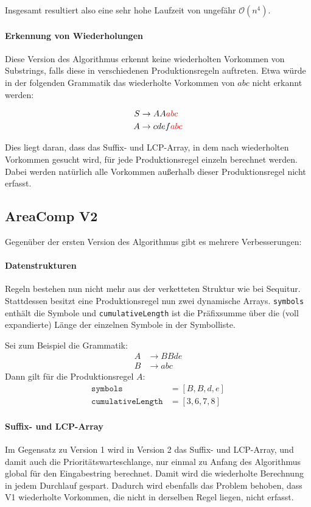 Insgesamt resultiert also eine sehr hohe Laufzeit von ungefähr $\mathcal{O}(n^4)$.

\paragraph{Erkennung von Wiederholungen}
Diese Version des Algorithmus erkennt keine wiederholten Vorkommen von Substrings, falls diese in verschiedenen Produktionsregeln auftreten.
Etwa würde in der folgenden Grammatik das wiederholte Vorkommen von $abc$ nicht erkannt werden:

\begin{align*}
	S &\rightarrow AA\textcolor{red}{abc}\\
	A &\rightarrow cdef\textcolor{red}{abc}
\end{align*}

Dies liegt daran, dass das Suffix- und LCP-Array, in dem nach wiederholten Vorkommen gesucht wird, für jede Produktionsregel einzeln berechnet werden. Dabei werden natürlich alle Vorkommen außerhalb dieser Produktionsregel nicht erfasst.

\subsection{AreaComp V2}

Gegenüber der ersten Version des Algorithmus gibt es mehrere Verbesserungen:

\paragraph{Datenstrukturen} Regeln bestehen nun nicht mehr aus der verketteten Struktur wie bei Sequitur. Stattdessen besitzt eine Produktionsregel nun zwei dynamische Arrays. \texttt{symbols} enthält die Symbole und \texttt{cumulativeLength} ist die Präfixsumme über die (voll expandierte) Länge der einzelnen Symbole in der Symbolliste.

Sei zum Beispiel die Grammatik: 
\begin{align*}
	A &\rightarrow BBde\\
	B &\rightarrow abc
\end{align*}
Dann gilt für die Produktionsregel $A$: 
\begin{align*}
	\texttt{symbols} &= [B, B, d, e]\\
	\texttt{cumulativeLength} &= [3, 6, 7, 8]
\end{align*}

\paragraph{Suffix- und LCP-Array}
Im Gegensatz zu Version 1 wird in Version 2 das Suffix- und LCP-Array, und damit auch die Prioritätswarteschlange, nur einmal zu Anfang des Algorithmus global für den Eingabestring berechnet. Damit wird die wiederholte Berechnung in jedem Durchlauf gespart. 
Dadurch wird ebenfalls das Problem behoben, dass V1 wiederholte Vorkommen, die nicht in derselben Regel liegen, nicht erfasst.

